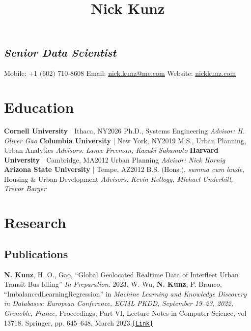 \documentclass{article}
\title{
    \vspace{-48pt}
    \textbf{Nick Kunz}
    \vspace{-56pt}
}
\date{}
\begin{document}
    \maketitle
    \subsection*{\textit{Senior Data Scientist}}
        Mobile: \space\space\space\space\space+1 $($602$)$ 710-8608\newline
        Email: \space\space\space\space\space\space\url{nick.kunz@me.com}\newline
        Website: \space\space\space\space\url{nickkunz.com}
    \section*{Education}
        \textbf{Cornell University} | Ithaca, NY\hfill{2026}\newline
        Ph.D., Systems Engineering\newline
        \textit{Advisor: H. Oliver Gao}\newline\newline
        \textbf{Columbia University} | New York, NY\hfill{2019}\newline
        M.S., Urban Planning, Urban Analytics\newline
        \textit{Advisors: Lance Freeman, Kazuki Sakamoto}\newline\newline
        \textbf{Harvard University} | Cambridge, MA\hfill{2012}\newline
        Urban Planning\newline
        \textit{Advisor: Nick Hornig}\newline\newline
        \textbf{Arizona State University} | Tempe, AZ\hfill{2012}\newline
        B.S. $($Hons.$)$, \textit{summa cum laude}, Housing \& Urban Development\newline
        \textit{Advisors: Kevin Kellogg, Michael Underhill, Trevor Barger}
    \section*{Research}
    \subsection*{Publications}
        \textbf{N. Kunz}, H. O., Gao, ``Global Geolocated Realtime Data of Interfleet Urban Transit Bus Idling'' \textit{In Preparation.} 2023.\newline\newline
        W. Wu, \textbf{N. Kunz}, P. Branco, ``ImbalancedLearningRegression'' in \textit{Machine Learning and Knowledge Discovery in Databases: European Conference, ECML PKDD, September 19–23, 2022, Grenoble, France,} Proceedings, Part VI, Lecture Notes in Computer Science, vol 13718. Springer, pp. 645–648, March 2023.\space\href{https://doi.org/10.1007/978-3-031-26422-1}{\texttt{[Link]}}
\end{document}
